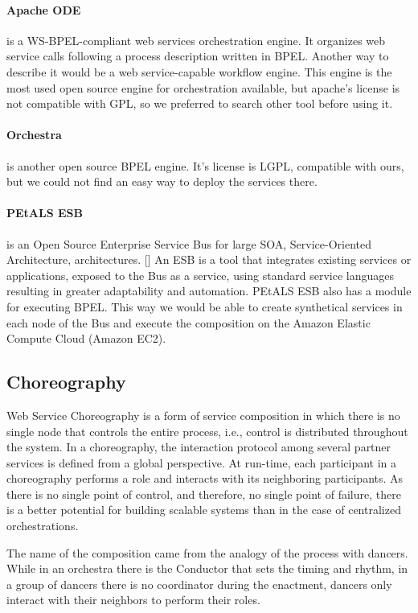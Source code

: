 \paragraph{Apache ODE}
is a WS-BPEL-compliant web services orchestration engine. It organizes web service calls following a process description written in BPEL. Another way to describe it would be a web service-capable workflow engine. This engine is the most used open source engine for orchestration available, but apache's license is not compatible with GPL, so we preferred to search other tool before using it.

\paragraph{Orchestra}
is another open source BPEL engine. It's license is LGPL, compatible with ours, but we could not find an easy way to deploy the services there.

\paragraph{PEtALS ESB}
is an Open Source Enterprise Service Bus for large SOA, Service-Oriented Architecture, architectures. [\citet{PEtALS}] An ESB is a tool that integrates existing services or applications, exposed to the Bus as a service, using standard service languages resulting in greater adaptability and automation. PEtALS ESB also has a module for executing BPEL. This way we would be able to create synthetical services in each node of the Bus and execute the composition on the Amazon Elastic Compute Cloud (Amazon EC2).


\subsection{Choreography}
Web Service Choreography is a form of service composition in which there is no single node that controls the entire process, i.e., control is distributed throughout the system. In a choreography, the interaction protocol among several partner services is defined from a global perspective. At run-time, each participant in a choreography performs a role and interacts with its neighboring participants. As there is no single point of control, and therefore, no single point of failure, there is a better potential for building scalable systems than in the case of centralized orchestrations.

The name of the composition came from the analogy of the process with dancers. While in an orchestra there is the Conductor that sets the timing and rhythm, in a group of dancers there is no coordinator during the enactment, dancers only interact with their neighbors to perform their roles.

